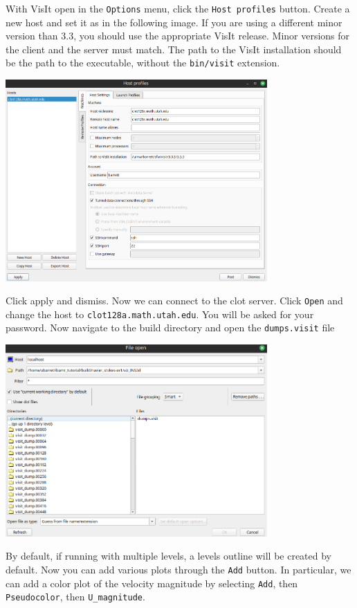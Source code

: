 \documentclass{article}
\begin{document}
With VisIt open in the \verb|Options| menu, click the \verb|Host profiles| button. Create a new host and set it as in the following image. If you are using a different minor version than 3.3, you should use the appropriate VisIt release. Minor versions for the client and the server must match. The path to the VisIt installation should be the path to the executable, without the \verb|bin/visit| extension.
\begin{center}
\includegraphics[width=0.75\textwidth]{Graphs/visit_host_profiles.png}
\end{center}
Click apply and dismiss. Now we can connect to the clot server. Click \verb|Open| and change the host to \verb|clot128a.math.utah.edu|. You will be asked for your password. Now navigate to the build directory and open the \verb|dumps.visit| file
\begin{center}
\includegraphics[width=0.75\textwidth]{Graphs/visit_ns-ex1.png}
\end{center}
By default, if running with multiple levels, a levels outline will be created by default. Now you can add various plots through the \verb|Add| button. In particular, we can add a color plot of the velocity magnitude by selecting \verb|Add|, then \verb|Pseudocolor|, then \verb|U_magnitude|.
\end{document}
